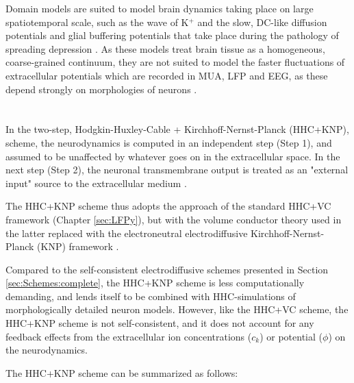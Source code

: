Domain models are suited to model brain dynamics taking place on large spatiotemporal scale, such as the wave of K$^+$ and the slow, DC-like diffusion potentials and glial buffering potentials that take place during the pathology of spreading depression \cite{Mori2015, OConnell2016, tuttle2019}. As these models treat brain tissue as a homogeneous, coarse-grained continuum, they are not suited to model the faster fluctuations of extracellular potentials which are recorded in MUA, LFP and EEG, as these depend strongly on morphologies of neurons \cite{Einevoll2013}. 



\section{}
\label{sec:Schemes:KNP}
In the two-step, Hodgkin-Huxley-Cable + Kirchhoff-Nernst-Planck (HHC+KNP), scheme, the neurodynamics is computed in an independent step (Step 1), and assumed to be unaffected by whatever goes on in the extracellular space. In the next step (Step 2), the neuronal transmembrane output is treated as an "external input" source to the extracellular medium \cite{Halnes2016, Solbra2018}. 

The HHC+KNP scheme thus adopts the approach of the standard HHC+VC framework (Chapter \ref{sec:LFPy}), but with the volume conductor theory used in the latter replaced with the electroneutral electrodiffusive Kirchhoff-Nernst-Planck (KNP) framework \cite{Halnes2016, Solbra2018, ellingsrud2020}. 

Compared to the self-consistent electrodiffusive schemes presented in Section \ref{sec:Schemes:complete}, the HHC+KNP scheme is less computationally demanding, and lends itself to be combined with HHC-simulations of morphologically detailed neuron models. However, like the HHC+VC scheme, the HHC+KNP scheme is not self-consistent, and it does not account for any feedback effects from the extracellular ion concentrations ($c_k$) or potential ($\phi$) on the neurodynamics.

The HHC+KNP scheme can be summarized as follows:

